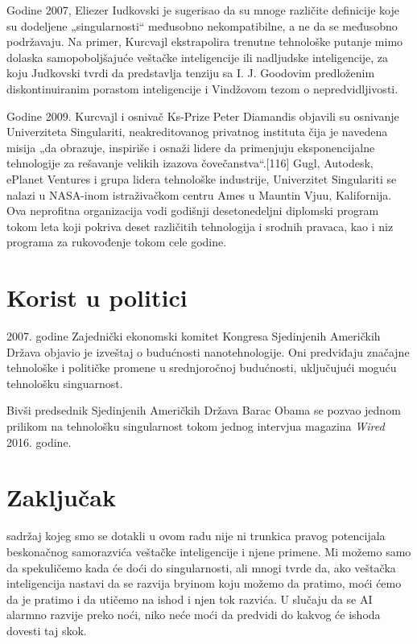 \documentclass[a4paper]{article}
\begin{document}
Godine 2007, Eliezer Iudkovski je sugerisao da su mnoge različite definicije koje su dodeljene „singularnosti“ međusobno nekompatibilne, a ne da se međusobno podržavaju. Na primer, Kurcvajl ekstrapolira trenutne tehnološke putanje mimo dolaska samopoboljšajuće veštačke inteligencije ili nadljudske inteligencije, za koju Judkovski tvrdi da predstavlja tenziju sa I. J. Goodovim predloženim diskontinuiranim porastom inteligencije i Vindžovom tezom o nepredvidljivosti.\cite{refe12}\cite{refe13}

Godine 2009. Kurcvajl i osnivač Ks-Prize Peter Diamandis objavili su osnivanje Univerziteta Singulariti, neakreditovanog privatnog instituta čija je navedena misija „da obrazuje, inspiriše i osnaži lidere da primenjuju eksponencijalne tehnologije za rešavanje velikih izazova čovečanstva“.[116] Gugl, Autodesk, ePlanet Ventures i grupa lidera tehnološke industrije, Univerzitet Singulariti se nalazi u NASA-inom istraživačkom centru Ames u Mauntin Vjuu, Kalifornija. Ova neprofitna organizacija vodi godišnji desetonedeljni diplomski program tokom leta koji pokriva deset različitih tehnologija i srodnih pravaca, kao i niz programa za rukovođenje tokom cele godine.\cite{refe14}


\section{Korist u politici}
\label{sec:politika}
2007. godine Zajednički ekonomski komitet Kongresa Sjedinjenih Američkih Država objavio je izveštaj o budućnosti nanotehnologije. Oni predviđaju značajne tehnološke i političke promene u srednjoročnoj budućnosti, uključujući moguću tehnološku singuarnost.\cite{refe15}\cite{refe16}\cite{refe17}

Bivši predsednik Sjedinjenih Američkih Država Barac Obama se pozvao jednom prilikom na tehnološku singularnost tokom jednog intervjua magazina \textit{Wired} 2016. godine.\cite{refe18}
\section{Zaključak}
\label{sec:zakljucak}
sadržaj kojeg smo se dotakli u ovom radu nije ni trunkica pravog potencijala beskonačnog samorazvića veštačke inteligencije i njene primene. Mi možemo samo da spekuličemo kada će doći do singularnosti, ali mnogi tvrde da, ako veštačka inteligencija nastavi da se razvija bryinom koju možemo da pratimo, moći ćemo da je pratimo i da utičemo na ishod i njen tok razvića. U slučaju da se AI alarmno razvije preko noći, niko neće moći da predvidi do kakvog će ishoda dovesti taj skok.
\end{document}
